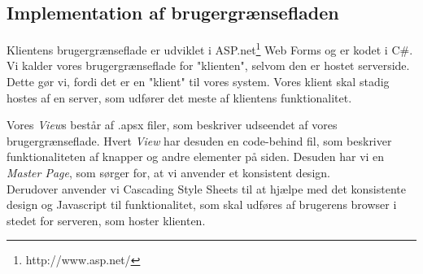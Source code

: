 \subsection{Implementation af brugergrænsefladen}
\label{Technical_Client_GUI}
Klientens brugergrænseflade er udviklet i ASP.net\footnote{http://www.asp.net/} Web Forms og er kodet i C\#. Vi kalder vores brugergrænseflade for "klienten", selvom den er hostet serverside. Dette gør vi, fordi det er en "klient" til vores system. Vores klient skal stadig hostes af en server, som udfører det meste af klientens funktionalitet.

 Vores \textit{View}s består af .apsx filer, som beskriver udseendet af vores brugergrænseflade. Hvert \textit{View} har desuden en code-behind fil, som beskriver funktionaliteten af knapper og andre elementer på siden. Desuden har vi en \textit{Master Page}, som sørger for, at vi anvender et konsistent design.
\\Derudover anvender vi Cascading Style Sheets til at hjælpe med det konsistente design og Javascript til funktionalitet, som skal udføres af brugerens browser i stedet for serveren, som hoster klienten.